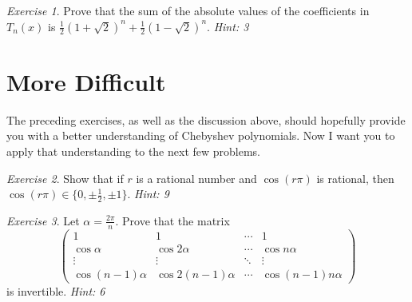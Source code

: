 \documentclass{article}
\theoremstyle{definition}
\theoremstyle{remark}
\newtheorem{exercise}{Exercise}
\begin{document}
\begin{exercise}
Prove that the sum of the absolute values of the coefficients in $T_n(x)$ is $\frac{1}{2}(1+\sqrt{2})^n + \frac{1}{2}(1-\sqrt{2})^n$. \emph{Hint: 3}
\end{exercise}

\section{More Difficult}
The preceding exercises, as well as the discussion above, should hopefully provide you with a better understanding of Chebyshev polynomials. Now I want you to apply that understanding to the next few problems.

\begin{exercise}
Show that if $r$ is a rational number and $\cos(r\pi)$ is rational, then $\cos(r\pi)\in \{0,\pm\frac{1}{2},\pm 1\}$. \emph{Hint: 9}
\end{exercise}

\begin{exercise}
Let $\alpha = \frac{2\pi}{n}$. Prove that the matrix
\[\begin{pmatrix} 1 & 1 & \cdots & 1 \\ \cos\alpha & \cos 2\alpha & \cdots & \cos{n\alpha} \\
\vdots & \vdots & \ddots & \vdots \\
\cos(n-1)\alpha & \cos 2(n-1)\alpha & \cdots & \cos (n-1)n\alpha \end{pmatrix}\] is invertible.  \emph{Hint: 6}
\end{exercise}
\end{document}
